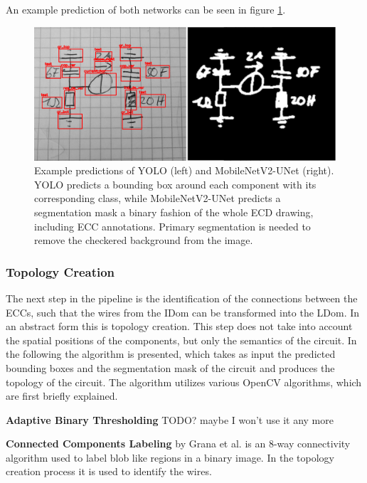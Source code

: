 An example prediction of both networks can be seen in figure \ref{fig:example_predictions}.

\begin{figure}
\begin{center}
    \includegraphics[width=16cm]{imgs/pipeline/combined_pred.png}
    \caption{Example predictions of YOLO (left) and MobileNetV2-UNet (right). YOLO predicts a bounding box around each component with its corresponding class, while MobileNetV2-UNet predicts a segmentation mask a binary fashion of the whole \ac{ECD} drawing, including \ac{ECC} annotations. Primary segmentation is needed to remove the checkered background from the image.}
    \label{fig:example_predictions}
\end{center}
\end{figure}

\subsubsection{Topology Creation}

The next step in the pipeline is the identification of the connections between the \acp{ECC}, such that the wires from the \ac{IDom} can be transformed into the \ac{LDom}.
In an abstract form this is topology creation.
This step does not take into account the spatial positions of the components, but only the semantics of the circuit.
In the following the algorithm is presented, which takes as input the predicted bounding boxes and the segmentation mask of the circuit and produces the topology of the circuit.
The algorithm utilizes various OpenCV algorithms, which are first briefly explained.

\textbf{Adaptive Binary Thresholding} TODO? maybe I won't use it any more

\textbf{Connected Components Labeling} by Grana et al. \cite{cca} is an 8-way connectivity algorithm used to label blob like regions in a binary image.
In the topology creation process it is used to identify the wires.

